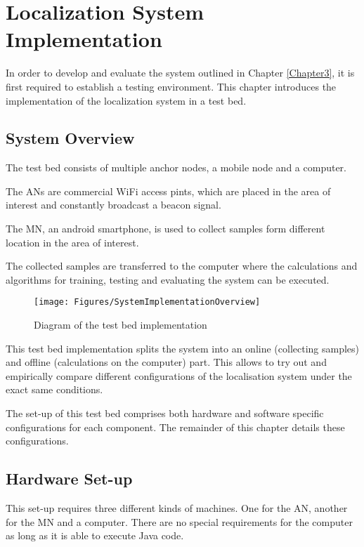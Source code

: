 \chapter{Localization System Implementation}

\label{Chapter4}

In order to develop and evaluate the system outlined in Chapter \ref{Chapter3}, it is first required to establish a testing environment.
This chapter introduces the implementation of the localization system in a test bed.

\section{System Overview}

The test bed consists of multiple anchor nodes, a mobile node and a computer.

The ANs are commercial WiFi access pints, which are placed in the area of interest and constantly broadcast a beacon signal.

The MN, an android smartphone, is used to collect samples form different location in the area of interest. 

The collected samples are transferred to the computer where the calculations and algorithms for training, testing and evaluating the system can be executed.

\begin{figure}[ht]
\centering
\texttt{[image: Figures/SystemImplementationOverview]}
\decoRule
\caption[localization system overview]{Diagram of the test bed implementation}
\label{fig:localizationSystemOverview}
\end{figure}

This test bed implementation splits the system into an online (collecting samples) and offline (calculations on the computer) part. This allows to try out and empirically compare different configurations of the localisation system under the exact same conditions.

The set-up of this test bed comprises both hardware and software specific configurations for each component. The remainder of this chapter details these configurations.

\section{Hardware Set-up}

This set-up requires three different kinds of machines. One for the AN, another for the MN and a computer. There are no special requirements for the computer as long as it is able to execute Java code.

